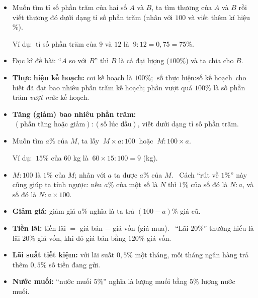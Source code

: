 \begin{knowbox}\begin{itemize}[leftmargin=1.4em,itemsep=3pt]
\item Muốn tìm tỉ số phần trăm của hai số $A$ và $B$, ta tìm thương của $A$ và $B$ rồi viết thương đó dưới dạng tỉ số phần trăm (nhân với $100$ và viết thêm kí hiệu $\%$).\par
Ví dụ: $\ $tỉ số phần trăm của $9$ và $12$ là $\ 9:12=0{,}75=75\%$.
\item Đọc kĩ đề bài: ``$A$ so với $B$'' thì $B$ là cả đại lượng ($100\%$) và ta chia cho $B$.
\item \textbf{Thực hiện kế hoạch:} coi kế hoạch là $100\%$; $\ \text{số thực hiện}:\text{số kế hoạch}$ cho biết đã đạt bao nhiêu phần trăm kế hoạch; phần vượt quá $100\%$ là số phần trăm \emph{vượt mức} kế hoạch.
\item \textbf{Tăng (giảm) bao nhiêu phần trăm:} $\ (\text{phần tăng hoặc giảm}):(\text{số lúc đầu})$, viết dưới dạng tỉ số phần trăm.
\end{itemize}
\end{knowbox}
\gap
{}
\begin{knowbox}\begin{itemize}[leftmargin=1.4em,itemsep=3pt]
\item Muốn tìm $a\%$ của $M$, ta lấy $\ M\times a:100\ $ hoặc $\ M:100\times a$.\par
Ví dụ: $\ 15\%$ của $60$ kg là $\ 60\times15:100=9$ (kg).
\item $M:100$ là $1\%$ của $M$; nhân với $a$ ta được $a\%$ của $M$. \ Cách ``rút về $1\%$'' này cũng giúp ta tính ngược: nếu $a\%$ của một số là $N$ thì $1\%$ của số đó là $N:a$, và số đó là $N:a\times100$.
\end{itemize}
\end{knowbox}
\gap
{}
\begin{knowbox}\begin{itemize}[leftmargin=1.4em,itemsep=3pt]
\item \textbf{Giảm giá:} giảm giá $a\%$ nghĩa là ta trả $(100-a)\%$ giá cũ.
\item \textbf{Tiền lãi:} tiền lãi $=$ giá bán $-$ giá vốn (giá mua). \ ``Lãi $20\%$'' thường hiểu là lãi $20\%$ giá vốn, khi đó giá bán bằng $120\%$ giá vốn.
\item \textbf{Lãi suất tiết kiệm:} với lãi suất $0{,}5\%$ một tháng, mỗi tháng ngân hàng trả thêm $0{,}5\%$ số tiền đang gửi.
\item \textbf{Nước muối:} ``nước muối $5\%$'' nghĩa là lượng muối bằng $5\%$ lượng nước muối.
\end{itemize}
\end{knowbox}
